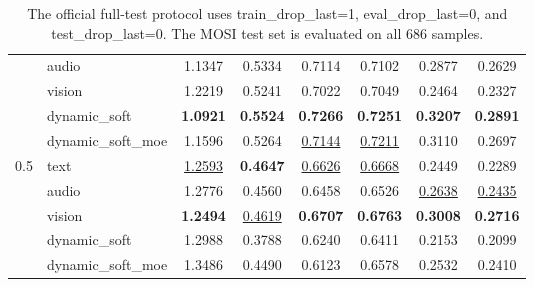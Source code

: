 \begin{table}[t]
\begin{tabular}{llcccccc}
 & audio & 1.1347 & 0.5334 & 0.7114 & 0.7102 & 0.2877 & 0.2629 \\
 & vision & 1.2219 & 0.5241 & 0.7022 & 0.7049 & 0.2464 & 0.2327 \\
 & dynamic_soft & \textbf{1.0921} & \textbf{0.5524} & \textbf{0.7266} & \textbf{0.7251} & \textbf{0.3207} & \textbf{0.2891} \\
 & dynamic_soft_moe & 1.1596 & 0.5264 & \underline{0.7144} & \underline{0.7211} & 0.3110 & 0.2697 \\
\midrule
0.5 & text & \underline{1.2593} & \textbf{0.4647} & \underline{0.6626} & \underline{0.6668} & 0.2449 & 0.2289 \\
 & audio & 1.2776 & 0.4560 & 0.6458 & 0.6526 & \underline{0.2638} & \underline{0.2435} \\
 & vision & \textbf{1.2494} & \underline{0.4619} & \textbf{0.6707} & \textbf{0.6763} & \textbf{0.3008} & \textbf{0.2716} \\
 & dynamic_soft & 1.2988 & 0.3788 & 0.6240 & 0.6411 & 0.2153 & 0.2099 \\
 & dynamic_soft_moe & 1.3486 & 0.4490 & 0.6123 & 0.6578 & 0.2532 & 0.2410 \\
\bottomrule
\end{tabular}
\vspace{0.3em}
\caption*{The official full-test protocol uses train\_drop\_last=1, eval\_drop\_last=0, and test\_drop\_last=0. The MOSI test set is evaluated on all 686 samples.}
\end{table}
